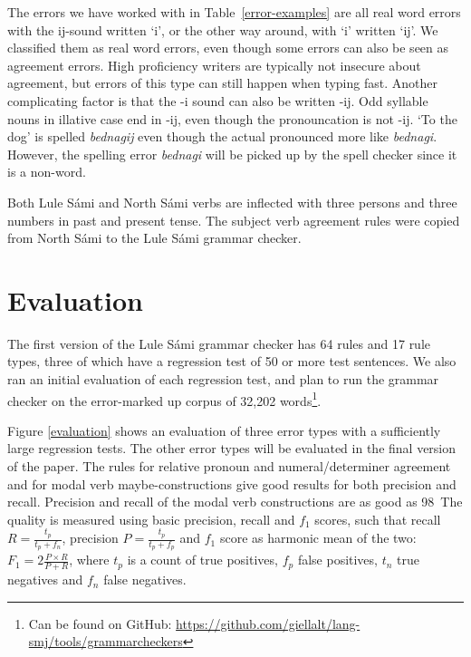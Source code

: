 \documentclass[free]{flammie}
\begin{document}
The errors we have worked with in Table~\ref{error-examples} are all real word
errors with the ij-sound written `i', or the other way around, with `i' written
`ij'. We classified them as real word errors, even though some errors can also
be seen as agreement errors. High proficiency writers are typically not insecure
about agreement, but errors of this type can still happen when typing fast.
Another complicating factor is that the -i sound can also be written -ij. Odd
syllable nouns in illative case end in -ij, even though the pronouncation is not
-ij. `To the dog' is spelled \textit{bednagij} even though the actual pronounced
more like \textit{bednagi}. However, the spelling error \textit{bednagi} will be
picked up by the spell checker since it is a non-word.






















Both Lule Sámi and North Sámi verbs are inflected with three persons and three
numbers in past and present tense. The subject verb agreement rules were copied
from North Sámi to the Lule Sámi grammar checker.




\section{Evaluation}

The first version of the Lule Sámi grammar checker has 64 rules and 17 rule
types, three of which have a regression test of 50 or more test sentences.  We
also ran an initial evaluation of each regression test, and plan to run the
grammar checker on the error-marked up corpus of 32,202 words\footnote{Can be
found on GitHub:
\url{https://github.com/giellalt/lang-smj/tools/grammarcheckers}}.











Figure \ref{evaluation} shows an evaluation of three error types with a
sufficiently large regression tests. The other error types will be evaluated in
the final version of the paper. The rules for relative pronoun and
numeral/determiner agreement and for modal verb maybe-constructions give good
results for both precision and recall. Precision and recall of the modal verb
constructions are as good as 98\ The quality is measured using basic precision,
recall and $f_1$ scores, such that recall $R=\frac{t_p}{t_p+f_n}$, precision
$P=\frac{t_p}{t_p+f_p}$ and $f_1$ score as harmonic mean of the two: $F_1 = 2
\frac{P \times R}{P + R}$, where $t_p$ is a count of true positives, $f_p$ false
positives, $t_n$ true negatives and $f_n$ false negatives.
\end{document}
